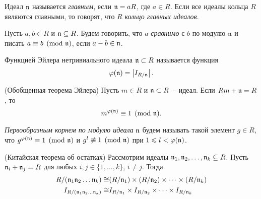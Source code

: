 \documentclass[_00_dissertation.tex]{subfiles}
\begin{document}
\begin{definition}
    Идеал $\mathfrak{n}$ называется \emph{главным}, если $\mathfrak{n} = aR$, где $a \in R$.
    Если все идеалы кольца $R$ являются главными, то говорят, что $R$ \emph{кольцо главных идеалов}.
\end{definition}

\begin{definition}
    Пусть $a, b \in R$ и $\mathfrak{n} \subseteq R$.
    Будем говорить, что $a$ \emph{сравнимо} с $b$ по модулю $\mathfrak{n}$ и писать $a \equiv b \pmod{\mathfrak{n}}$, если $a - b \in \mathfrak{n}$.
\end{definition}

\begin{definition} \cite[с.~285]{source:Petukhova}
    Функцией Эйлера нетривиального идеала $\mathfrak{n} \subset R$ называется функция
    \begin{equation*}
        \varphi(\mathfrak{n}) = \left|
            I_{R/\mathfrak{n}}
        \right|.
    \end{equation*}
\end{definition}

\begin{statement}\label{statement:euler_function} \cite[с.~285]{source:Petukhova} (Обобщенная теорема Эйлера)
    Пусть $m \in R$ и $\mathfrak{n} \subset R$~-- идеал.
    Если $Rm + \mathfrak{n} = R$, то
    \begin{equation*}
        m^{\varphi(\mathfrak{n})}\equiv 1 \pmod{\mathfrak{n}}.
    \end{equation*}
\end{statement}

\begin{definition}
    \emph{Первообразным корнем по модулю идеала} $\mathfrak{n}$ будем называть такой элемент $g \in R$, что $g^{\varphi (\mathfrak{n})} \equiv 1 \pmod{\mathfrak{n}}$ и $g^{l} \not\equiv 1 \pmod{\mathfrak{n}}$ при $1 \leqslant l < \varphi(\mathfrak{n})$.
\end{definition}

\begin{statement}\label{statement:chinese_remainder_theorem} \cite[с.~11]{source:Lang} (Китайская теорема об остатках)
    Рассмотрим идеалы $\mathfrak{n}_1, \mathfrak{n}_2, \dots, \mathfrak{n}_k \subseteq R$.
    Пусть $\mathfrak{n}_i + \mathfrak{n}_j = R$ для любых $i, j \in \{1, \dots, k\}$, $i \neq j$.
    Тогда
    \begin{equation*}
        \begin{split}
            R/(\mathfrak{n}_1\mathfrak{n}_2\dots\mathfrak{n}_k) \cong & (R/\mathfrak{n}_1) \times (R/\mathfrak{n}_2) \times \dots \times (R/\mathfrak{n}_k)\\
            I_{R/(\mathfrak{n}_1\mathfrak{n}_2\dots\mathfrak{n}_k)} \cong & I_{R/\mathfrak{n}_1} \times I_{R/\mathfrak{n}_2} \times \dots \times I_{R/\mathfrak{n}_k}
        \end{split}
    \end{equation*}
\end{statement}
\end{document}
